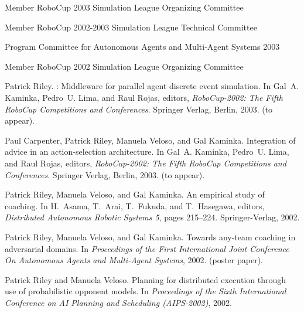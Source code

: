 \documentclass[ComputerScience]{vita}
\begin{document}
\begin{vita}
  \begin{Professional Activities}
    \item Member RoboCup 2003 Simulation League Organizing Committee
    \item Member RoboCup 2002-2003 Simulation League Technical Committee
    \item Program Committee for Autonomous Agents and Multi-Agent
     Systems 2003
    \item Member RoboCup 2002 Simulation League Organizing Committee
  \end{Professional Activities}
  
  \begin{Publications}

   \item 
    Patrick Riley.
    : Middleware for parallel agent discrete event simulation.
    \newblock In Gal~A. Kaminka, Pedro~U. Lima, and Raul Rojas, editors, {\em
      {R}obo{C}up-2002: The Fifth {R}obo{C}up Competitions and Conferences}.
    Springer Verlag, Berlin, 2003.
    \newblock (to appear).

   \item 
    Paul Carpenter, Patrick Riley, Manuela Veloso, and Gal Kaminka.
    \newblock Integration of advice in an action-selection architecture.
    \newblock In Gal~A. Kaminka, Pedro~U. Lima, and Raul Rojas, editors, {\em
      {R}obo{C}up-2002: The Fifth {R}obo{C}up Competitions and Conferences}.
    Springer Verlag, Berlin, 2003.
    \newblock (to appear).

   \item 
    Patrick Riley, Manuela Veloso, and Gal Kaminka.
    \newblock An empirical study of coaching.
    \newblock In H.~Asama, T.~Arai, T.~Fukuda, and T.~Hasegawa, editors, {\em
      Distributed Autonomous Robotic Systems 5}, pages 215--224. Springer-Verlag,
    2002.

   \item
    Patrick Riley, Manuela Veloso, and Gal Kaminka.
    \newblock Towards any-team coaching in adversarial domains.
    \newblock In {\em Proceedings of the First International Joint Conference On
      Autonomous Agents and Multi-Agent Systems}, 2002.
    \newblock (poster paper).

   \item
    Patrick Riley and Manuela Veloso.
    \newblock Planning for distributed execution through use of probabilistic
    opponent models.
    \newblock In {\em Proceedings of the Sixth International Conference on AI
      Planning and Scheduling (AIPS-2002)}, 2002.


\end{Publications}
\end{vita}
\end{document}
